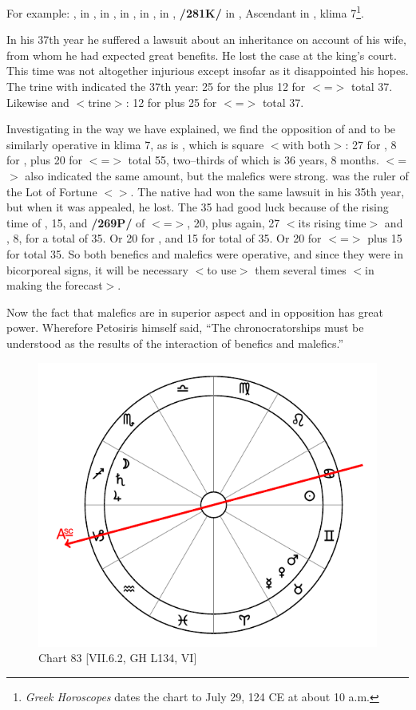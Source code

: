 For example: \Sun, \Moon\xspace in \Leo, \Saturn\xspace in \Virgo, \Jupiter\xspace in \Pisces, \Mars\xspace in \Sagittarius, \Venus\xspace in \Gemini, \textbf{/281K/} \Mercury\xspace in \Cancer, Ascendant in \Libra, klima 7\footnote{\textit{Greek Horoscopes} dates the chart to July 29, 124 CE at about 10 a.m.}. 

In his 37th year he suffered a lawsuit about an inheritance on account of his wife, from whom he had expected great benefits. He lost the case at the king’s court. This time was not altogether injurious except insofar as it disappointed his hopes. The \Moon\xspace trine with \Mars\xspace indicated the 37th year: 25 for the \Moon\xspace plus 12 for \Sagittarius\xspace $<$=\Jupiter$>$ total 37. Likewise \Jupiter\xspace and \Mercury\xspace $<$trine$>$: 12 for \Jupiter\xspace plus 25 for \Cancer\xspace $<$=\Moon$>$ total 37. 

Investigating in the way we have explained, we find the opposition of \Mars\xspace and \Venus\xspace to be similarly operative in klima
7, as is \Saturn, which is square $<$with both$>$: 27 for \Gemini, 8 for \Venus, plus 20 for \Virgo $<$=\Mercury$>$ total 55, two--thirds of which is 36 years, 8 months. \Pisces\xspace $<$=\Saturn$>$ also indicated the same amount, but the malefics were strong. \Venus\xspace was the ruler of the Lot of Fortune $<$\Libra$>$. The native had won the same lawsuit in his 35th year, but when it was appealed, he lost. The 35 had good luck because of the rising time of \Pisces, 15, and \textbf{/269P/} of \Gemini\xspace $<$=\Mercury$>$, 20, plus \Gemini\xspace again, 27 $<$its rising time$>$ and \Venus, 8, for a total of 35. Or 20 for \Gemini, and 15 for \Mars\xspace total of 35. Or 20 for \Virgo\xspace $<$=\Mercury$>$ plus 15 for \Mars\xspace total 35. So both benefics and malefics were operative, and since they were in bicorporeal signs, it will be necessary $<$to use$>$ them several times $<$in making the forecast$>$. 

Now \mndl the fact that malefics are in superior aspect and in opposition has great power. Wherefore Petosiris himself said, “The chronocratorships must be understood as the results of the interaction of benefics and malefics.” 

\newpage
\begin{figure}
\centering
\vspace{0pt}
\includegraphics[width=.68\textwidth]{charts/7_6_02}
\caption{Chart 83 [VII.6.2, GH L134, VI]}
\label{fig:chart83}
\end{figure} 

